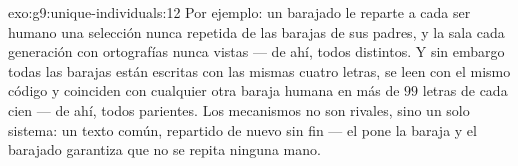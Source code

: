 \begin{solution}{exo:g9:unique-individuals:12}
Por ejemplo: un barajado le reparte a cada ser humano una selección
nunca repetida de las barajas de sus padres, y la  sala cada
generación con ortografías nunca vistas --- de ahí, todos distintos. Y
sin embargo todas las barajas están escritas con las mismas cuatro
letras, se leen con el mismo código y coinciden con cualquier otra
baraja humana en más de $99$ letras de cada cien --- de ahí, todos
parientes. Los mecanismos no son rivales, sino un solo sistema: un
texto común, repartido de nuevo sin fin --- el  pone la
baraja y el barajado garantiza que no se repita ninguna mano.
\end{solution}

